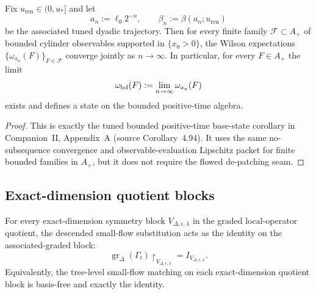 
\begin{corollary}\label{cor:bounded-base-state}
Fix $u_{\mathrm{ren}}\in(0,u_*]$ and let
\[
a_n:=\ell_0 2^{-n},\qquad \beta_n:=\beta(a_n;u_{\mathrm{ren}})
\]
be the associated tuned dyadic trajectory. Then for every finite family $\mathcal F\subset A_+$ of bounded cylinder observables supported in $\{x_0>0\}$, the Wilson expectations $\{\omega_{a_n}(F)\}_{F\in\mathcal F}$ converge jointly as $n\to\infty$. In particular, for every $F\in A_+$ the limit
\[
\omega_{\mathrm{bd}}(F):=\lim_{n\to\infty}\omega_{a_n}(F)
\]
exists and defines a state on the bounded positive-time algebra.
\end{corollary}

\begin{proof}
This is exactly the tuned bounded positive-time base-state corollary in Companion~II, Appendix~A (source Corollary~4.94). It uses the same no-subsequence convergence and observable-evaluation Lipschitz packet for finite bounded families in $A_+$, but it does not require the flowed de-patching seam.
\end{proof}

\subsection{Exact-dimension quotient blocks}

\begin{theorem}\label{thm:exact-dimension-identity}
For every exact-dimension symmetry block $V_{\Delta,\epsilon,\lambda}$ in the graded local-operator quotient, the descended small-flow substitution acts as the identity on the associated-graded block:
\[
\operatorname{gr}_{\Delta}(\Gamma_t)\!\upharpoonright_{V_{\Delta,\epsilon,\lambda}}=I_{V_{\Delta,\epsilon,\lambda}}.
\]
Equivalently, the tree-level small-flow matching on each exact-dimension quotient block is basis-free and exactly the identity.
\end{theorem}

